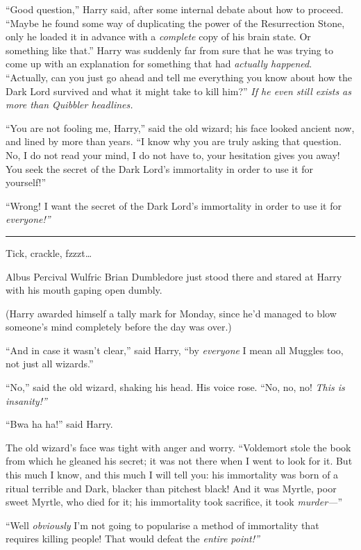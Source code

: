 ``Good question,'' Harry said, after some internal debate about how to
proceed. ``Maybe he found some way of duplicating the power of the
Resurrection Stone, only he loaded it in advance with a \emph{complete}
copy of his brain state. Or something like that.'' Harry was suddenly
far from sure that he was trying to come up with an explanation for
something that had \emph{actually happened}. ``Actually, can you just go
ahead and tell me everything you know about how the Dark Lord survived
and what it might take to kill him?'' \emph{If he even still exists as
more than Quibbler headlines.}

``You are not fooling me, Harry,'' said the old wizard; his face looked
ancient now, and lined by more than years. ``I know why you are truly
asking that question. No, I do not read your mind, I do not have to,
your hesitation gives you away! You seek the secret of the Dark Lord's
immortality in order to use it for yourself!''

``Wrong! I want the secret of the Dark Lord's immortality in order to
use it for \emph{everyone!''}

\begin{center}\rule{3in}{0.4pt}\end{center}

Tick, crackle, fzzzt\ldots{}

Albus Percival Wulfric Brian Dumbledore just stood there and stared at
Harry with his mouth gaping open dumbly.

(Harry awarded himself a tally mark for Monday, since he'd managed to
blow someone's mind completely before the day was over.)

``And in case it wasn't clear,'' said Harry, ``by \emph{everyone} I mean
all Muggles too, not just all wizards.''

``No,'' said the old wizard, shaking his head. His voice rose. ``No, no,
no! \emph{This is insanity!''}

``Bwa ha ha!'' said Harry.

The old wizard's face was tight with anger and worry. ``Voldemort stole
the book from which he gleaned his secret; it was not there when I went
to look for it. But this much I know, and this much I will tell you: his
immortality was born of a ritual terrible and Dark, blacker than
pitchest black! And it was Myrtle, poor sweet Myrtle, who died for it;
his immortality took sacrifice, it took \emph{murder---}''

``Well \emph{obviously} I'm not going to popularise a method of
immortality that requires killing people! That would defeat the
\emph{entire point!''}

